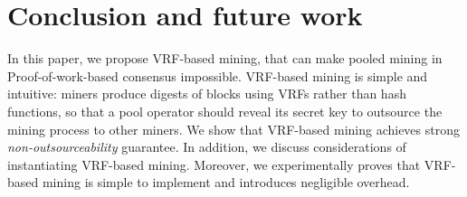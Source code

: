 \section{Conclusion and future work}
\label{sec:conclusion}

In this paper, we propose VRF-based mining, that can make pooled mining in Proof-of-work-based consensus impossible.
VRF-based mining is simple and intuitive: miners produce digests of blocks using VRFs rather than hash functions, so that a pool operator should reveal its secret key to outsource the mining process to other miners.
We show that VRF-based mining achieves strong \emph{non-outsourceability} guarantee.
In addition, we discuss considerations of instantiating VRF-based mining.
Moreover, we experimentally proves that VRF-based mining is simple to implement and introduces negligible overhead.
